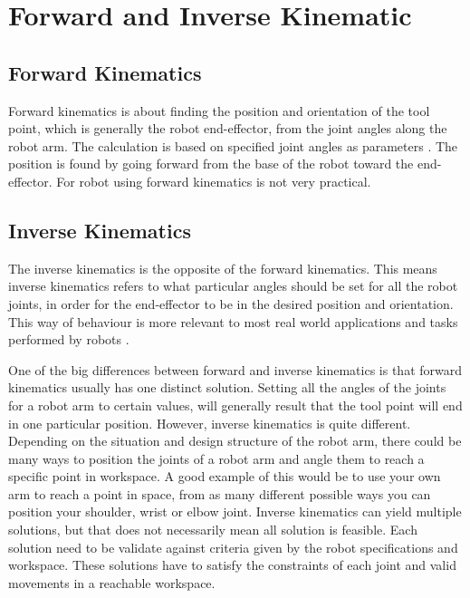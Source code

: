 \section{Forward and Inverse Kinematic}

\subsection{Forward Kinematics}

Forward kinematics is about finding the position and orientation of the tool point, which is generally the robot end-effector, from the joint angles along the robot arm. The calculation is based on specified joint angles as parameters \cite{forward_kinematics}. The position is found by going forward from the base of the robot toward the end-effector. For robot using forward kinematics is not very practical. 

\subsection{Inverse Kinematics}

The inverse kinematics is the opposite of the forward kinematics. This means inverse kinematics refers to what particular angles should be set for all the robot joints, in order for the end-effector to be in the desired position and orientation. This way of behaviour is more relevant to most real world applications and tasks performed by robots \cite{inverse_kinematics}. 

One of the big differences between forward and inverse kinematics is that forward kinematics usually has one distinct solution. Setting all the angles of the joints for a robot arm to certain values, will generally result that the tool point will end in one particular position. However, inverse kinematics is quite different. Depending on the situation and design structure of the robot arm, there could be many ways to position the joints of a robot arm and angle them to reach a specific point in workspace. A good example of this would be to use your own arm to reach a point in space, from as many different possible ways you can position your shoulder, wrist or elbow joint. Inverse kinematics can yield multiple solutions, but that does not necessarily mean all solution is feasible. Each solution need to be validate against criteria given by the robot specifications and workspace. These solutions have to satisfy the constraints of each joint and valid movements in a reachable workspace.
